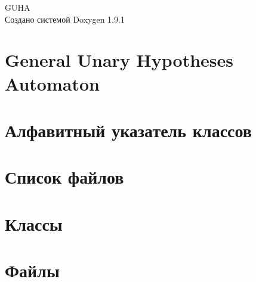 \let\mypdfximage\pdfximage\def\pdfximage{\immediate\mypdfximage}\documentclass[twoside]{book}
\newcommand{\+}{\discretionary{\mbox{\scriptsize$\hookleftarrow$}}{}{}}
\newcommand{\clearemptydoublepage}{%
  \newpage{\pagestyle{empty}\cleardoublepage}%
}
\begin{document}
\raggedbottom

\begin{titlepage}
\vspace*{7cm}
\begin{center}%
{\Large GUHA }\\
\vspace*{1cm}
{\large Создано системой Doxygen 1.9.1}\\
\end{center}
\end{titlepage}
\clearemptydoublepage
{}
\tableofcontents
\clearemptydoublepage
{}

\chapter{General Unary Hypotheses Automaton}
\label{index}
\chapter{Алфавитный указатель классов}

\chapter{Список файлов}

\chapter{Классы}

\chapter{Файлы}




\backmatter
\newpage
{}
\clearemptydoublepage
{}
\printindex
\end{document}
